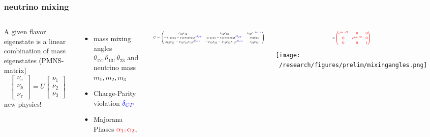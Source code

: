 \documentclass{beamer}
\begin{document}
	\begin{frame}
		\frametitle{neutrino mixing}
			\begin{columns}
			A given flavor eigenstate is a linear combination of mass eigenstates (PMNS-matrix)
			\begin{equation*}
			\begin{bmatrix}
			\nu_e \\
			\nu_{\mu} \\
			\nu_{\tau}
			\end{bmatrix}
			= U
			\begin{bmatrix}
			\nu_1 \\
			\nu_2 \\
			\nu_3
			\end{bmatrix}
			\end{equation*}			
			new physics!
			{\tiny
			\begin{itemize}
			 \item mass mixing angles $\theta_{12},\theta_{13},\theta_{23}$ and neutrino mass $m_1, m_2, m_3$
			 \item Charge-Parity violation $\textcolor{blue}{\delta_{CP}}$ 
			 \item Majorana Phases $\textcolor{red}{\alpha_1, \alpha_2}$,
			\end{itemize}
			}
			 
			\begin{equation*}		
			\resizebox{5.7cm}{!}{$U = \begin{pmatrix}
			c_{12}c_{13} & s_{12}c_{13} & s_{13}e^{-i\textcolor{blue}{\delta_{CP}}} \\
			-s_{12}c_{23}-c_{12}s_{23}s_{13}e^{i\textcolor{blue}{\delta_{CP}}} & c_{12}c_{23}-s_{12}s_{23}s_{13}e^{i\textcolor{blue}{\delta_{CP}}}
			& s_{23}c_{13} \\ s_{12}s_{23}-c_{12}c_{23}s_{13}e^{i\textcolor{blue}{\delta_{CP}}} & 
			-c_{12}s_{23}-s_{12}c_{23}s_{13}e^{i\textcolor{blue}{\delta_{CP}}} & c_{23}c_{13}
			\end{pmatrix}$}
			\end{equation*}
			
			\begin{equation*}
			\resizebox{2cm}{!}{$
			\times 
			\textcolor{red}{
			\begin{pmatrix}
			e^{i\alpha_1 /2} & 0 & 0 \\
			0 & e^{i\alpha_2 /2} & 0 \\
			0 & 0 & 1
			\end{pmatrix}}$}
			\end{equation*}
			\texttt{[image: ~/research/figures/prelim/mixingangles.png]}
			\end{columns}
	\end{frame}
	
\end{document}
